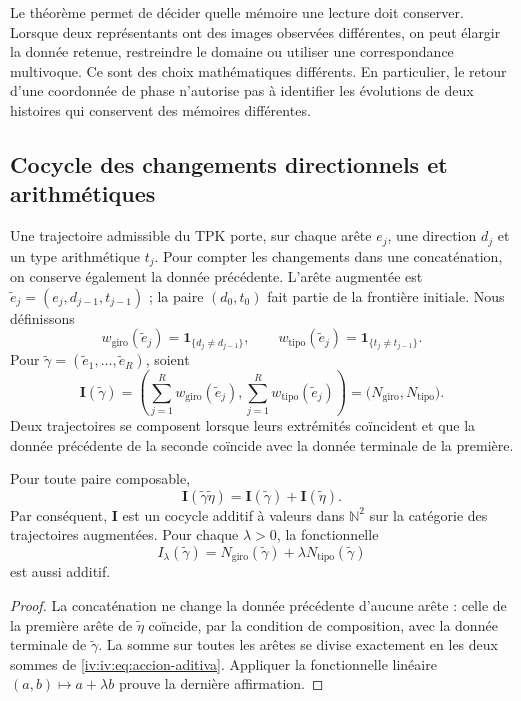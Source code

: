 Le théorème permet de décider quelle mémoire une
lecture doit conserver. Lorsque deux représentants ont des images observées
différentes, on peut élargir la donnée retenue, restreindre
le domaine ou utiliser une correspondance multivoque.
Ce sont des choix mathématiques différents. En particulier, le
retour d’une coordonnée de phase n’autorise pas à identifier
les évolutions de deux histoires qui conservent des mémoires
différentes.

\subsection{Cocycle des changements directionnels et arithmétiques}

Une trajectoire admissible du TPK porte, sur chaque arête
\(e_j\), une direction \(d_j\) et un type arithmétique
\(t_j\). Pour compter les changements dans une concaténation,
on conserve également la donnée précédente. L’arête augmentée est
\(\widetilde e_j=(e_j,d_{j-1},t_{j-1})\) ; la paire
\((d_0,t_0)\) fait partie de la frontière initiale. Nous définissons
\[
 w_{\mathrm{giro}}(\widetilde e_j)
       =\mathbf1_{\{d_j\ne d_{j-1}\}},\qquad
 w_{\mathrm{tipo}}(\widetilde e_j)
       =\mathbf1_{\{t_j\ne t_{j-1}\}}.
\]
Pour \(\widetilde\gamma=(\widetilde e_1,\ldots,
\widetilde e_R)\), soient
\begin{equation}
 \mathbf I(\widetilde\gamma)=
 \left(\sum_{j=1}^R w_{\mathrm{giro}}(\widetilde e_j),
       \sum_{j=1}^R w_{\mathrm{tipo}}(\widetilde e_j)\right)
 =\bigl(N_{\mathrm{giro}},N_{\mathrm{tipo}}\bigr).
 \label{iv:iv:eq:cociclo-accion}
\end{equation}
Deux trajectoires se composent lorsque leurs extrémités coïncident
et que la donnée précédente de la seconde coïncide avec la donnée
terminale de la première.

\begin{proposition}
\label{iv:iv:prop:accion-aditiva}
Pour toute paire composable,
\begin{equation}
 \mathbf I(\widetilde\gamma\widetilde\eta)
 =\mathbf I(\widetilde\gamma)+\mathbf I(\widetilde\eta).
 \label{iv:iv:eq:accion-aditiva}
\end{equation}
Par conséquent, \(\mathbf I\) est un cocycle additif à valeurs
dans \(\mathbb N^2\) sur la catégorie des trajectoires
augmentées. Pour chaque \(\lambda>0\), la fonctionnelle
\[
 I_\lambda(\widetilde\gamma)
 =N_{\mathrm{giro}}(\widetilde\gamma)
      +\lambda N_{\mathrm{tipo}}(\widetilde\gamma)
\]
est aussi additif.
\end{proposition}
\begin{proof}
La concaténation ne change la donnée précédente d’aucune
arête : celle de la première arête de \(\widetilde\eta\)
coïncide, par la condition de composition, avec la donnée terminale
de \(\widetilde\gamma\). La somme sur toutes les arêtes
se divise exactement en les deux sommes de
\eqref{iv:iv:eq:accion-aditiva}. Appliquer la fonctionnelle linéaire
\((a,b)\mapsto a+\lambda b\) prouve la dernière affirmation.
\end{proof}

